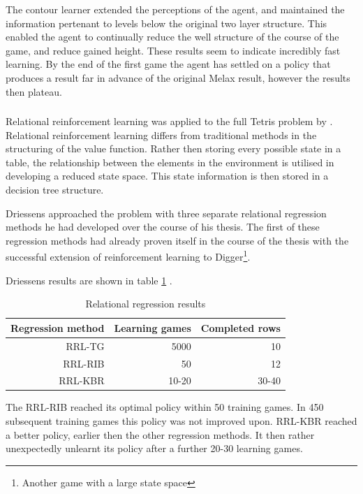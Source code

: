 \documentclass{rucsthesis}
\begin{document}
The contour learner extended the perceptions of the agent, and maintained the information pertenant to levels below the original two layer structure. This enabled the agent to continually reduce the well structure of the course of the game, and reduce gained height. These results seem to indicate incredibly fast learning. By the end of the first game the agent has settled on a policy that produces a result far in advance of the original Melax result, however the results then plateau. 

\subsubsection{\cite{kurt}}

Relational reinforcement learning was applied to the full Tetris problem by \cite{kurt}. Relational reinforcement learning differs from traditional methods in the structuring of the value function. Rather then storing every possible state in a table, the relationship between the elements in the environment is utilised in developing a reduced state space. This state information is then stored in a decision tree structure. 

Driessens approached the problem with three separate relational regression methods \citep{kurt} he had developed over the course of his thesis. The first of these regression methods had already proven itself in the course of the thesis with the successful extension of reinforcement learning to Digger\footnote{Another game with a large state space}. 

Driessens results are shown in table \ref{tbl:driessens} .

\begin{table}[h]
\centering
\begin{tabular}{|r|r|r|}
\hline
Regression method & Learning games & Completed rows  \\
\hline
RRL-TG	&	5000	& 	10   \\
\hline
RRL-RIB  &  50  & 12  \\
\hline
RRL-KBR  &  10-20  & 30-40  \\
\hline
\end{tabular}
\caption{Relational regression results \citep{kurt}}
\label{tbl:driessens}
\end{table}

The RRL-RIB reached its optimal policy within 50 training games. In 450 subsequent training games this policy was not improved upon. RRL-KBR reached a better policy, earlier then the other regression methods. It then rather unexpectedly unlearnt its policy after a further 20-30 learning games.
\end{document}
